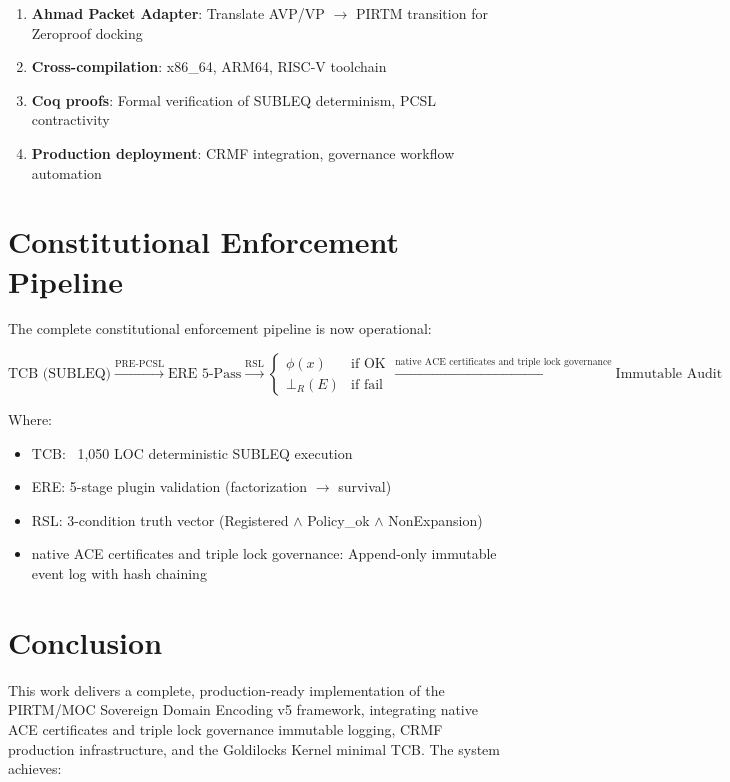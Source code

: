\documentclass[11pt,a4paper]{article}
\begin{document}
\begin{enumerate}
    \item \textbf{Ahmad Packet Adapter}: Translate AVP/VP $\to$ PIRTM transition for Zeroproof docking
    \item \textbf{Cross-compilation}: x86\_64, ARM64, RISC-V toolchain
    \item \textbf{Coq proofs}: Formal verification of SUBLEQ determinism, PCSL contractivity
    \item \textbf{Production deployment}: CRMF integration, governance workflow automation
\end{enumerate}

\section{Constitutional Enforcement Pipeline}

The complete constitutional enforcement pipeline is now operational:

\begin{equation}
\boxed{
\text{TCB (SUBLEQ)} \xrightarrow{\text{PRE-PCSL}} 
\text{ERE 5-Pass} \xrightarrow{\text{RSL}} 
\begin{cases}
\phi(x) & \text{if OK} \\
\bot_R(E) & \text{if fail}
\end{cases}
\xrightarrow{\text{native ACE certificates and triple lock governance}} \text{Immutable Audit}
}
\end{equation}

Where:
\begin{itemize}
    \item TCB: ~1,050 LOC deterministic SUBLEQ execution
    \item ERE: 5-stage plugin validation (factorization $\to$ survival)
    \item RSL: 3-condition truth vector (Registered $\land$ Policy\_ok $\land$ NonExpansion)
    \item native ACE certificates and triple lock governance: Append-only immutable event log with hash chaining
\end{itemize}

\section{Conclusion}

This work delivers a complete, production-ready implementation of the PIRTM/MOC Sovereign Domain Encoding v5 framework, integrating native ACE certificates and triple lock governance immutable logging, CRMF production infrastructure, and the Goldilocks Kernel minimal TCB. The system achieves:
\end{document}
